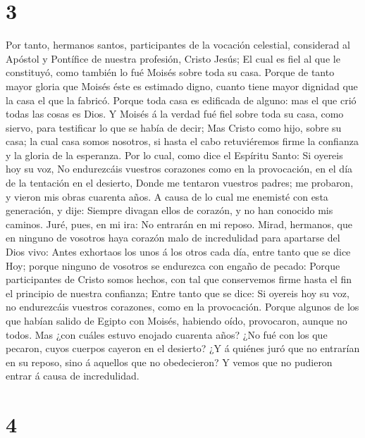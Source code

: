 \hypertarget{section-2}{%
\section{3}\label{section-2}}

 Por tanto, hermanos santos, participantes de la vocación
celestial, considerad al Apóstol y Pontífice de nuestra profesión,
Cristo Jesús;  El cual es fiel al que le constituyó, como
también lo fué Moisés sobre toda su casa.  Porque de tanto
mayor gloria que Moisés éste es estimado digno, cuanto tiene mayor
dignidad que la casa el que la fabricó.  Porque toda casa
es edificada de alguno: mas el que crió todas las cosas es Dios.
 Y Moisés á la verdad fué fiel sobre toda su casa, como
siervo, para testificar lo que se había de decir;  Mas
Cristo como hijo, sobre su casa; la cual casa somos nosotros, si hasta
el cabo retuviéremos firme la confianza y la gloria de la esperanza.
 Por lo cual, como dice el Espíritu Santo: Si oyereis hoy
su voz,  No endurezcáis vuestros corazones como en la
provocación, en el día de la tentación en el desierto, 
Donde me tentaron vuestros padres; me probaron, y vieron mis obras
cuarenta años.  A causa de lo cual me enemisté con esta
generación, y dije: Siempre divagan ellos de corazón, y no han conocido
mis caminos.  Juré, pues, en mi ira: No entrarán en mi
reposo.  Mirad, hermanos, que en ninguno de vosotros haya
corazón malo de incredulidad para apartarse del Dios vivo:
 Antes exhortaos los unos á los otros cada día, entre
tanto que se dice Hoy; porque ninguno de vosotros se endurezca con
engaño de pecado:  Porque participantes de Cristo somos
hechos, con tal que conservemos firme hasta el fin el principio de
nuestra confianza;  Entre tanto que se dice: Si oyereis
hoy su voz, no endurezcáis vuestros corazones, como en la provocación.
 Porque algunos de los que habían salido de Egipto con
Moisés, habiendo oído, provocaron, aunque no todos.  Mas
¿con cuáles estuvo enojado cuarenta años? ¿No fué con los que pecaron,
cuyos cuerpos cayeron en el desierto?  ¿Y á quiénes juró
que no entrarían en su reposo, sino á aquellos que no obedecieron?
 Y vemos que no pudieron entrar á causa de incredulidad.

\hypertarget{section-3}{%
\section{4}\label{section-3}}

